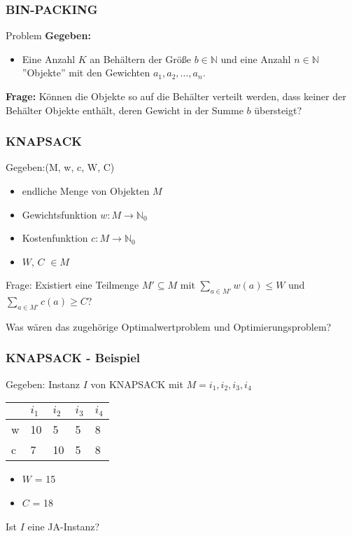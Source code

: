 \documentclass{beamer}
\begin{document}
{\begin{frame}
\frametitle{BIN-PACKING}
\begin{block}{Problem}
\textbf{Gegeben:}
\begin{itemize}
 \item Eine Anzahl $K$ an Behältern der Größe $b \in \mathbb{N}$ und eine Anzahl $n \in \mathbb{N}$ ''Objekte'' mit den Gewichten $a_1, a_2,\ldots,a_n$.
\end{itemize}
\textbf{Frage:}
Können die Objekte so auf die Behälter verteilt werden, dass keiner der Behälter Objekte enthält, deren Gewicht in der Summe $b$ übersteigt?
\end{block}
\end{frame}

\begin{frame}
 \frametitle{KNAPSACK}
 Gegeben:(M, w, c, W, C)
 \begin{itemize}
  \item endliche Menge von Objekten $M$
  \item Gewichtsfunktion $w:M \rightarrow \mathbb{N}_0$
  \item Kostenfunktion $c:M \rightarrow \mathbb{N}_0$
  \item $W$, $C$ $\in M$
 \end{itemize}
Frage: Existiert eine Teilmenge $M' \subseteq M$ mit $\sum_{a\in M'} w(a) \leq W$ und $\sum_{a\in  M'} c(a) \geq C$?
\pause

Was wären das zugehörige Optimalwertproblem und Optimierungsproblem?
\end{frame}

\begin{frame}
 \frametitle{KNAPSACK - Beispiel}
 Gegeben: Instanz $I$ von KNAPSACK mit $M = {i_1, i_2, i_3, i_4}$
  \begin{center}
\begin{tabular}{l|l|l|l|l}
	  &$i_1$ &$i_2$ &$i_3$ 	&$i_4$\\
  \hline
	w &10	 &5	&5	&8\\
  \hline
	c &7	 &10	&5	&8\\	
\end{tabular}
\end{center}
\begin{itemize}
 \item $W$ = 15
 \item $C$ = 18
\end{itemize}
Ist $I$ eine JA-Instanz?
\end{frame}

}
\end{document}
